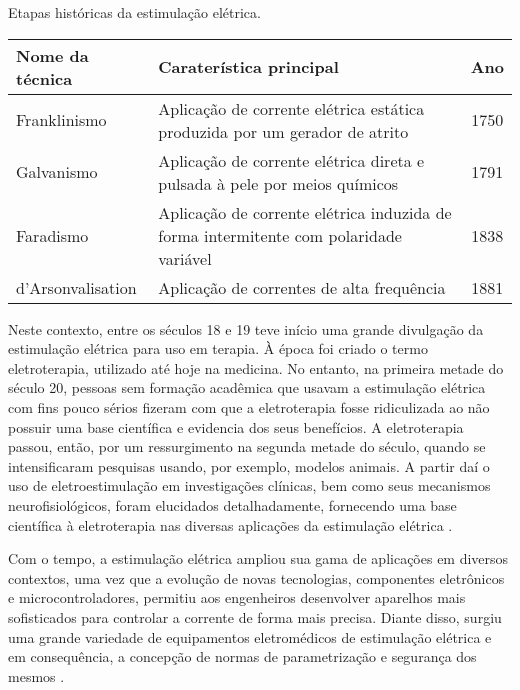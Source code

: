 \smallskip

\begin{quadro}
    \caption{Etapas históricas da estimulação elétrica.}
    \centering
    \begin{tabular}{|>{\centering\arraybackslash} m{2.5cm}|p{8cm}|c|}
        \hline
        \rowcolor{lightgray} \textbf{Nome da técnica} &\textbf{Caraterística principal} & \textbf{Ano} \\
        \hline
        Franklinismo
        & Aplicação de corrente elétrica estática produzida por um gerador de atrito & 1750 \\
        \hline
        Galvanismo & Aplicação de corrente elétrica direta e pulsada à pele por meios químicos  & 1791  \\
        \hline
        Faradismo & Aplicação de corrente elétrica induzida de forma intermitente com polaridade variável & 1838  \\
        \hline
        d'Arsonvalisation  & Aplicação de correntes de alta frequência  & 1881 \\
        \hline     
    \end{tabular}
    \label{q1}
\end{quadro}

Neste contexto, entre os séculos 18 e 19 teve início uma grande divulgação da estimulação elétrica para uso em terapia. À época foi criado o termo eletroterapia, utilizado até hoje na medicina. No entanto, na primeira metade do século 20, pessoas sem formação acadêmica que usavam a estimulação elétrica com fins pouco sérios fizeram com que a eletroterapia fosse ridiculizada ao não possuir uma base científica e evidencia dos seus benefícios. A eletroterapia passou, então, por um ressurgimento na segunda metade do século, quando se intensificaram pesquisas usando, por exemplo, modelos animais. A partir daí o uso de eletroestimulação em investigações clínicas, bem como seus mecanismos neurofisiológicos, foram elucidados detalhadamente, fornecendo uma base científica à eletroterapia nas diversas aplicações da estimulação elétrica \cite{Heidland2013}.

Com o tempo, a estimulação elétrica ampliou sua gama de aplicações em diversos contextos, uma vez que a evolução de novas tecnologias, componentes eletrônicos e microcontroladores, permitiu aos engenheiros desenvolver aparelhos mais sofisticados para controlar a corrente de forma mais precisa. Diante disso, surgiu uma grande variedade de equipamentos eletromédicos de estimulação elétrica e em consequência, a concepção de normas de parametrização e segurança dos mesmos \cite{Sanches2013}.

